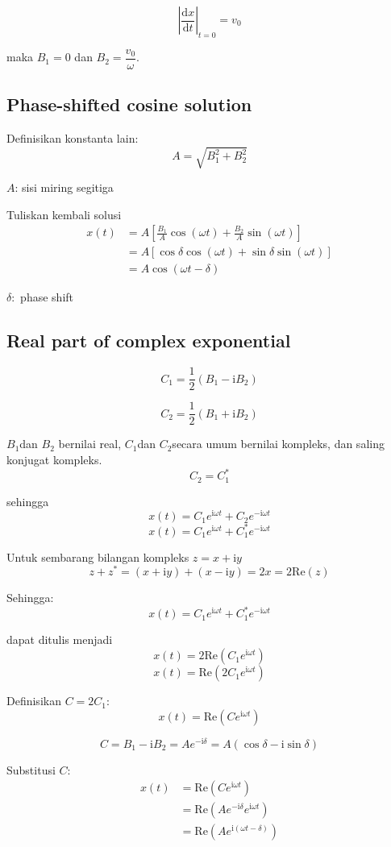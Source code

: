 \[
\left|\frac{\mathrm{d}x}{\mathrm{d}t}\right|_{t=0}=v_{0}
\]

maka $B_{1}=0$ dan $B_{2}=\dfrac{v_{0}}{\omega}$.

\subsection*{Phase-shifted cosine solution}

Definisikan konstanta lain:
\[
A=\sqrt{B_{1}^{2}+B_{2}^{2}}
\]

$A$: sisi miring segitiga

Tuliskan kembali solusi
\begin{align*}
x(t) & =A\left[\frac{B_{1}}{A}\cos(\omega t)+\frac{B_{2}}{A}\sin(\omega t)\right]\\
 & =A\left[\cos\delta\cos(\omega t)+\sin\delta\sin(\omega t)\right]\\
 & =A\cos(\omega t-\delta)
\end{align*}

$\delta:$ phase shift

\subsection*{Real part of complex exponential}

\[
C_{1}=\frac{1}{2}(B_{1}-\mathrm{i}B_{2})
\]

\[
C_{2}=\frac{1}{2}(B_{1}+\mathrm{i}B_{2})
\]

$B_{1}$dan $B_{2}$ bernilai real, $C_{1}$dan $C_{2}$secara umum
bernilai kompleks, dan saling konjugat kompleks.
\[
C_{2}=C_{1}^{*}
\]

sehingga
\[
x(t)=C_{1}e^{\mathrm{i}\omega t}+C_{2}e^{-\mathrm{i}\omega t}
\]
\[
x(t)=C_{1}e^{\mathrm{i}\omega t}+C_{1}^{*}e^{-\mathrm{i}\omega t}
\]

Untuk sembarang bilangan kompleks $z=x+\mathrm{i}y$
\[
z+z^{*}=(x+\mathrm{i}y)+(x-\mathrm{i}y)=2x=2\mathrm{Re}(z)
\]

Sehingga:
\[
x(t)=C_{1}e^{\mathrm{i}\omega t}+C_{1}^{*}e^{-\mathrm{i}\omega t}
\]

dapat ditulis menjadi
\[
x(t)=2\mathrm{Re}\left(C_{1}e^{\mathrm{i}\omega t}\right)
\]
\[
x(t)=\mathrm{Re}\left(2C_{1}e^{\mathrm{i}\omega t}\right)
\]

Definisikan $C=2C_{1}:$
\[
x(t)=\mathrm{Re}\left(Ce^{\mathrm{\mathrm{i}}\omega t}\right)
\]

\[
C=B_{1}-\mathrm{i}B_{2}=Ae^{\mathrm{-i}\delta}=A\left(\cos\delta-\mathrm{i}\sin\delta\right)
\]

Substitusi $C$:
\begin{align*}
x(t) & =\mathrm{Re}\left(Ce^{\mathrm{\mathrm{i}}\omega t}\right)\\
 & =\mathrm{Re}\left(Ae^{\mathrm{-i}\delta}e^{\mathrm{i}\omega t}\right)\\
 & =\mathrm{Re}\left(Ae^{\mathrm{i}(\omega t-\delta)}\right)
\end{align*}





